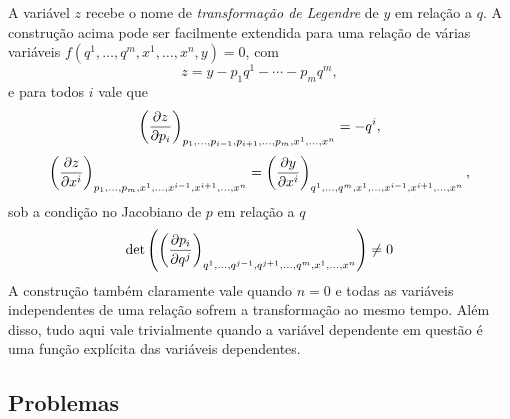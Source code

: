\documentclass[a4paper, 12pt]{article}
\newcommand{\pd}[3]{
    \ifblank{#3}{}{\left(}
    \frac{\partial #1}{\partial #2}
    \ifblank{#3}{}{\right)_{#3}}
}
\theoremstyle{definition}
\theoremstyle{definition}
\begin{document}
A variável $z$ recebe o nome de \textit{transformação de Legendre} de $y$ em relação a $q$. A 
construção acima pode ser facilmente extendida para uma relação de várias variáveis 
$f(q^1,\dots,q^m,x^1,\dots,x^n,y)=0$, com
$$z=y-p_1q^1-\cdots-p_mq^m,$$
e para todos $i$ vale que
$$\pd{z}{p_i}{p_1,\dots,p_{i-1},p_{i+1},\dots,p_m,x^1,\dots,x^n}=-q^i,$$
$$\pd{z}{x^i}{p_1,\dots,p_m,x^1,\dots,x^{i-1},x^{i+1},\dots,x^n}=
\pd{y}{x^i}{q^1,\dots,q^m,x^1,\dots,x^{i-1},x^{i+1},\dots,x^n},$$
sob a condição no Jacobiano de $p$ em relação a $q$
$$\det\left(\pd{p_i}{q^j}{q^1,\dots,q^{j-1},q^{j+1},\dots,q^m,x^1,\dots,x^n}\right)\neq0$$
A construção também claramente vale quando $n=0$ e todas as variáveis independentes de uma relação sofrem
a transformação ao mesmo tempo. Além disso, tudo aqui vale trivialmente quando a variável dependente
em questão é uma função explícita das variáveis dependentes.

\subsection{Problemas}
\end{document}
